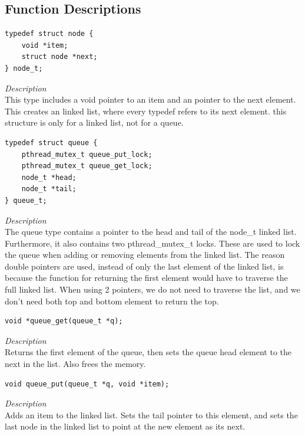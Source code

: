 \documentclass[11pt]{article}
\begin{document}
\subsection{Function Descriptions}


\begin{lstlisting}[style=customc]
typedef struct node {
    void *item;
    struct node *next;
} node_t;
\end{lstlisting}
\textit{Description} \\
This type includes a void pointer to an item and an pointer to the next element.
 This creates an linked list, where every typedef refers to its next element.
 this structure is only for a linked list, not for a queue.



\begin{lstlisting}[style=customc]
typedef struct queue {
    pthread_mutex_t queue_put_lock;
    pthread_mutex_t queue_get_lock;
    node_t *head;
    node_t *tail;
} queue_t;
\end{lstlisting}
\textit{Description} \\
The queue type contains a pointer to the head and tail of the node\_t linked list. Furthermore, it also 
contains two pthread\_mutex\_t locks. These are used to lock the queue when adding or removing elements
from the linked list. The reason double pointers are used, instead of only the last element of the linked list, is because the function for returning the first element would have to traverse the full linked list.
When using 2 pointers, we do not need to traverse the list, and we don't need both top and bottom element to return the top. 




\begin{lstlisting}[style=customc]
void *queue_get(queue_t *q);
\end{lstlisting}
\textit{Description} \\
Returns the first element of the queue, then sets the queue head element to the next in the list.
Also frees the memory.



\begin{lstlisting}[style=customc]
void queue_put(queue_t *q, void *item);
\end{lstlisting}
\textit{Description} \\
Adds an item to the linked list. Sets the tail pointer to this element, and sets the last node in the linked list to point at the new element as its next.
\end{document}
